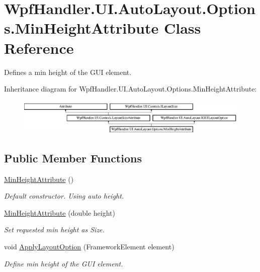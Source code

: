 \hypertarget{class_wpf_handler_1_1_u_i_1_1_auto_layout_1_1_options_1_1_min_height_attribute}{}\section{Wpf\+Handler.\+U\+I.\+Auto\+Layout.\+Options.\+Min\+Height\+Attribute Class Reference}
\label{class_wpf_handler_1_1_u_i_1_1_auto_layout_1_1_options_1_1_min_height_attribute}


Defines a min height of the G\+UI element.  


Inheritance diagram for Wpf\+Handler.\+U\+I.\+Auto\+Layout.\+Options.\+Min\+Height\+Attribute\+:\begin{figure}[H]
\begin{center}
\leavevmode
\includegraphics[height=1.723077cm]{d7/dff/class_wpf_handler_1_1_u_i_1_1_auto_layout_1_1_options_1_1_min_height_attribute}
\end{center}
\end{figure}
\subsection*{Public Member Functions}
\begin{DoxyCompactItemize}
\item 
\mbox{\hyperlink{class_wpf_handler_1_1_u_i_1_1_auto_layout_1_1_options_1_1_min_height_attribute_ad263ee4e1ae14222051889791d35c95e}{Min\+Height\+Attribute}} ()
\begin{DoxyCompactList}\small\item\em Default constructor. Using auto height. \end{DoxyCompactList}\item 
\mbox{\hyperlink{class_wpf_handler_1_1_u_i_1_1_auto_layout_1_1_options_1_1_min_height_attribute_a4c3ec69b8c292501be942bf6d89b5927}{Min\+Height\+Attribute}} (double height)
\begin{DoxyCompactList}\small\item\em Set requested min height as Size. \end{DoxyCompactList}\item 
void \mbox{\hyperlink{class_wpf_handler_1_1_u_i_1_1_auto_layout_1_1_options_1_1_min_height_attribute_a8c049220211484fea64fbd1589a4cc57}{Apply\+Layout\+Option}} (Framework\+Element element)
\begin{DoxyCompactList}\small\item\em Define min height of the G\+UI element. \end{DoxyCompactList}\end{DoxyCompactItemize}
